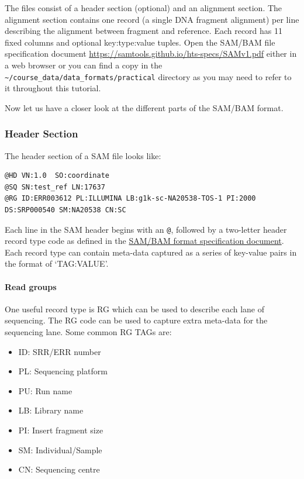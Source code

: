 \documentclass[11pt]{article}
\providecommand{\tightlist}{%
      \setlength{\itemsep}{0pt}\setlength{\parskip}{0pt}}
\begin{document}
The files consist of a header section (optional) and an alignment
section. The alignment section contains one record (a single DNA
fragment alignment) per line describing the alignment between fragment
and reference. Each record has 11 fixed columns and optional
key:type:value tuples. Open the SAM/BAM file specification document
\url{https://samtools.github.io/hts-specs/SAMv1.pdf} either in a web
browser or you can find a copy in the \lstinline{~/course_data/data_formats/practical} directory as you may need to refer to it throughout this tutorial.

Now let us have a closer look at the different parts of the SAM/BAM
format.

\hypertarget{header-section}{%
\subsubsection{Header Section}\label{header-section}}

The header section of a SAM file looks like:

\begin{verbatim}
@HD VN:1.0  SO:coordinate
@SQ SN:test_ref LN:17637
@RG ID:ERR003612 PL:ILLUMINA LB:g1k-sc-NA20538-TOS-1 PI:2000 DS:SRP000540 SM:NA20538 CN:SC
\end{verbatim}

Each line in the SAM header begins with an \texttt{@}, followed by a
two-letter header record type code as defined in the
\href{https://samtools.github.io/hts-specs/SAMv1.pdf}{SAM/BAM format
specification document}. Each record type can contain meta-data captured
as a series of key-value pairs in the format of `TAG:VALUE'.

\hypertarget{read-groups}{%
\paragraph{Read groups}\label{read-groups}}

One useful record type is RG which can be used to describe each lane of
sequencing. The RG code can be used to capture extra meta-data for the
sequencing lane. Some common RG TAGs are:

\begin{itemize}
\tightlist
\item
  ID: SRR/ERR number
\item
  PL: Sequencing platform
\item
  PU: Run name
\item
  LB: Library name
\item
  PI: Insert fragment size
\item
  SM: Individual/Sample
\item
  CN: Sequencing centre
\end{itemize}
\end{document}
